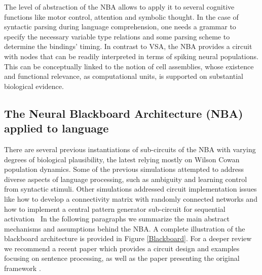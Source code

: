 \documentclass[10pt]{article}
\begin{document}
The level of abstraction of the NBA allows to apply it to several cognitive functions like motor control, attention and symbolic thought.
In the case of syntactic parsing during language comprehension, one needs a grammar to specify the necessary variable type relations and some parsing scheme to determine the bindings' timing.
In contrast to VSA, the NBA provides a circuit with nodes that can be readily interpreted in terms of spiking neural populations.
This can be conceptually linked to the notion of cell assemblies, whose existence and functional relevance, as computational units, is supported on substantial biological evidence\cite{Huyck_2013}.


\subsection{The Neural Blackboard Architecture (NBA) applied to language}

{\label{935508}}

There are several previous instantiations of sub-circuits of the NBA with varying degrees of biological plausibility, the latest relying mostly on Wilson Cowan population dynamics\cite{Destexhe_2009}.
Some of the previous simulations attempted to address diverse aspects of language processing, such as ambiguity\cite{Frank_2014} and learning control from syntactic stimuli\cite{van_der_Velde_2010}.
Other simulations addressed circuit implementation issues like how to develop a connectivity matrix with randomly connected networks\cite{van_der_Velde_2011} and how to implement a central pattern generator sub-circuit for sequential activation~\cite{van_Dijk_2015}
In the following paragraphs we summarize the main abstract mechanisms and assumptions behind the NBA.
A complete illustration of the blackboard architecture is provided in Figure {\ref{Blackboard}}.
For a deeper review we recommend a recent paper which provides a circuit design and examples focusing on sentence processing\cite{de2016combinatorial}, as well as the paper presenting the original framework \cite{van_der_Velde_2006}.
\end{document}
